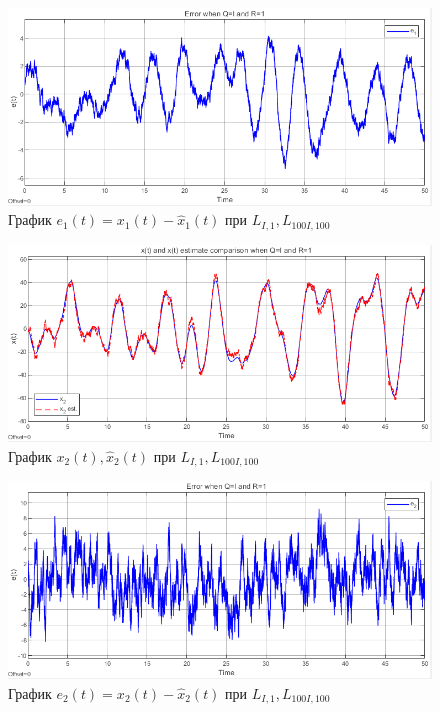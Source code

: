 \documentclass[a4paper, 12pt]{article}
\begin{document}
    \begin{figure}[H]
        \centering
        \includegraphics[scale=0.75]{2task_e1.png}
        \captionsetup{skip=0pt}
        \caption{График $e_1(t)=x_1(t)-\hat{x}_1(t)$ при $L_{I,1},L_{100I,100}$}
        \label{fig:2task_e1}
    \end{figure}
    \begin{figure}[H]
        \centering
        \includegraphics[scale=0.75]{2task_x2.png}
        \captionsetup{skip=0pt}
        \caption{График $x_2(t),\hat{x}_2(t)$ при $L_{I,1},L_{100I,100}$}
        \label{fig:2task_x2}
    \end{figure}
    \begin{figure}[H]
        \centering
        \includegraphics[scale=0.75]{2task_e2.png}
        \captionsetup{skip=0pt}
        \caption{График $e_2(t)=x_2(t)-\hat{x}_2(t)$ при $L_{I,1},L_{100I,100}$}
        \label{fig:2task_e2}
    \end{figure}
\end{document}

